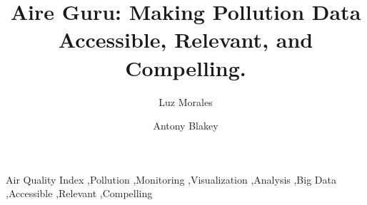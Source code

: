 \begin{frontmatter}

\title{Aire Guru: Making Pollution Data Accessible, Relevant, and Compelling.}

\author{Luz Morales}
\author{Antony Blakey}
\address{Illuminous\\ Johan van Hasseltweg 43-II, 1021 KN, Amsterdam}

\begin{abstract}
 
\end{abstract}   

\begin{keyword}
Air Quality Index \sep Pollution \sep Monitoring \sep Visualization \sep Analysis \sep Big Data
\sep Accessible \sep Relevant \sep Compelling
\end{keyword}

\end{frontmatter}